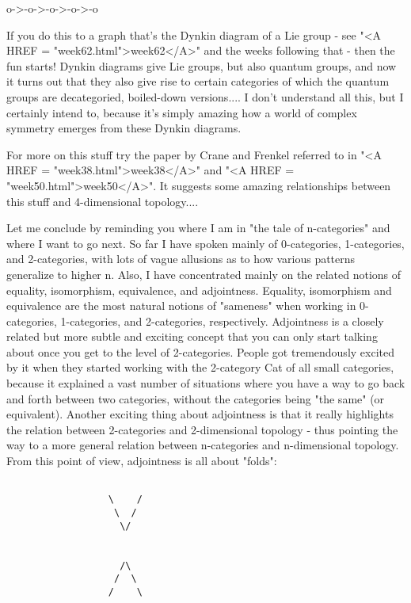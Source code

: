                       o->-o->-o->-o->-o

If you do this to a graph that's the Dynkin diagram of a Lie group -
see "<A HREF = "week62.html">week62</A>" and the weeks following that - then the fun starts!
Dynkin diagrams give Lie groups, but also quantum groups, and now it
turns out that they also give rise to certain categories of which the
quantum groups are decategoried, boiled-down versions.... I don't
understand all this, but I certainly intend to, because it's simply
amazing how a world of complex symmetry emerges from these Dynkin
diagrams.  

For more on this stuff try the paper by Crane and Frenkel referred to in
"<A HREF = "week38.html">week38</A>" and "<A HREF = "week50.html">week50</A>".  It suggests some amazing relationships between
this stuff and 4-dimensional topology....

Let me conclude by reminding you where I am in "the tale of n-categories"
and where I want to go next.  So far I have spoken mainly of 0-categories,
1-categories, and 2-categories, with lots of vague allusions as to how
various patterns generalize to higher n.  Also, I have concentrated mainly
on the related notions of equality, isomorphism, equivalence, and 
adjointness.  Equality, isomorphism and equivalence are the most natural 
notions of "sameness" when working in 0-categories, 1-categories, and 
2-categories, respectively.   Adjointness is a closely related but more 
subtle and exciting concept that you can only start talking about once
you get to the level of 2-categories.  People got tremendously excited
by it when they started working with the 2-category Cat of all small 
categories, because it explained a vast number of situations where you
have a way to go back and forth between two categories, without the
categories being "the same" (or equivalent).  Another exciting thing
about adjointness is that it really highlights the relation between
2-categories and 2-dimensional topology - thus pointing the way
to a more general relation between n-categories and n-dimensional topology.
From this point of view, adjointness is all about "folds":


\begin{verbatim}

                  \    /
                   \  /
                    \/


                    /\
                   /  \
                  /    \ 

\end{verbatim}
    
